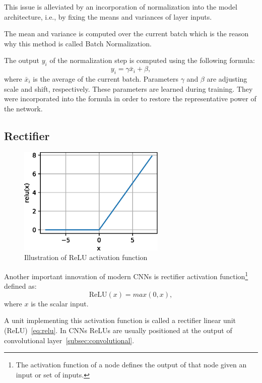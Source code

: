 This issue is alleviated by an incorporation of normalization into the model architecture, i.e., by fixing the means
and variances of layer inputs.

The mean and variance is computed over the current batch which is the reason why this method is called Batch
Normalization.

The output $y_i$ of the normalization step is computed using the following formula:
\begin{equation}
    y_i = \gamma \bar{x}_i + \beta,
\end{equation}
where $\bar{x}_i$ is the average of the current batch.
Parameters $\gamma$ and $\beta$ are adjusting scale and shift, respectively.
These parameters are learned during training.
They were incorporated into the formula in order to restore the representative power of the network.

\subsection{Rectifier}\label{subsec:rectifier}

\begin{figure}
    \label{fig:relu}
    \includegraphics[width=7cm]{images/cnn/relu.eps}
    \caption{Illustration of ReLU activation function~\cite{ReLU}}
\end{figure}

Another important innovation of modern CNNs is rectifier activation function\footnote{The activation function of
a node defines the output of that node given an input or set of inputs.} defined as:
\begin{equation}
    \label{eq:relu}
    \mathrm{ReLU}(x) = max(0,x),
\end{equation}
where $x$ is the scalar input.

A unit implementing this activation function is called a rectifier linear unit (ReLU)~\ref{eq:relu}.
In CNNs ReLUs are usually positioned at the output of convolutional layer~\ref{subsec:convolutional}.

